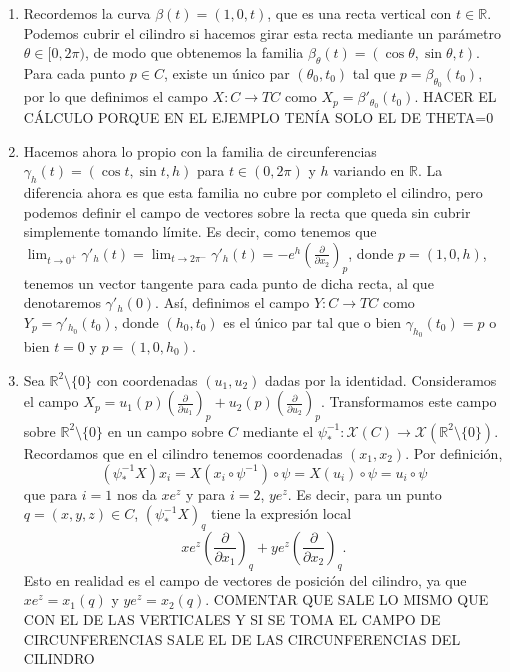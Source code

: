 \documentclass[twoside, 11pt]{article}
\theoremstyle{definition}
\newcommand{\R}{\mathbb{R}}
\newcommand{\parcial}[2]{\frac{\partial #1}{\partial #2}}
\begin{document}
\begin{enumerate}
\item
 Recordemos la curva $\beta(t)=(1,0,t)$, que es una recta vertical con $t\in\R$. Podemos cubrir el cilindro si hacemos girar esta recta mediante un parámetro $\theta\in[0,2\pi)$, de modo que obtenemos la familia $\beta_\theta(t)=(\cos\theta,\sin\theta, t)$. Para cada punto $p\in C$, existe un único par  $(\theta_0,t_0)$ tal que $p=\beta_{\theta_0}(t_0)$, por lo que definimos el campo $X:C\to TC$ como $X_p=\beta'_{\theta_0}(t_0)$. HACER EL CÁLCULO PORQUE EN EL EJEMPLO TENÍA SOLO EL DE THETA=0
 
\item Hacemos ahora lo propio con la familia de circunferencias $\gamma_h(t)=(\cos t,\sin t, h)$ para $t\in (0,2\pi)$ y $h$ variando en $\R$. La diferencia ahora es que esta familia no cubre por completo el cilindro, pero podemos definir el campo de vectores sobre la recta que queda sin cubrir simplemente tomando límite. Es decir, como tenemos que $\lim_{t\to 0^+}\gamma'_h(t)=\lim_{t\to 2\pi^-}\gamma'_h(t)=-e^h\left(\parcial{}{x_2}\right)_p$, donde $p=(1,0,h)$, tenemos un vector tangente para cada punto de dicha recta, al que denotaremos $\gamma'_h(0)$. Así, definimos el campo $Y:C\to TC$ como $Y_p=\gamma'_{h_0}(t_0)$, donde $(h_0, t_0)$ es el único par tal que o bien $\gamma_{h_0}(t_0)=p$ o bien $t=0$ y $p=(1,0,h_0)$. 

\item Sea $\R^2\setminus\{0\}$ con coordenadas $(u_1,u_2)$ dadas por la identidad. Consideramos el campo $X_p=u_1(p)\left(\parcial{}{u_1}\right)_p+u_2(p)\left(\parcial{}{u_2}\right)_p$. Transformamos este campo sobre $\R^2\setminus\{0\}$ en un campo sobre $C$ mediante el $\psi^{-1}_*:\mathcal{X}(C)\to\mathcal{X}(\R^2\setminus\{0\})$. Recordamos que en el cilindro tenemos coordenadas $(x_1,x_2)$. Por definición, 
\[
(\psi^{-1}_*X)x_i=X(x_i\circ \psi^{-1})\circ \psi=X(u_i)\circ\psi =u_i\circ\psi 
\]
que para $i=1$ nos da $xe^z$ y para $i=2$, $ye^z$. Es decir, para un punto $q=(x,y,z)\in C$, $(\psi^{-1}_*X)_q$ tiene la expresión local
\[
xe^z\left(\parcial{}{x_1}\right)_q+ye^z\left(\parcial{}{x_2}\right)_q.
\]
Esto en realidad es el campo de vectores de posición del cilindro, ya que $xe^z=x_1(q)$ y $ye^z=x_2(q)$. COMENTAR QUE SALE LO MISMO QUE CON EL DE LAS VERTICALES Y SI SE TOMA EL CAMPO DE CIRCUNFERENCIAS SALE EL DE LAS CIRCUNFERENCIAS DEL CILINDRO

\end{enumerate}
\end{document}
